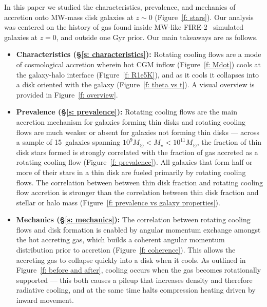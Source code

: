 \documentclass[fleqn,usenatbib]{mnras}
\newcommand{\Nsample}{15}
\begin{document}
In this paper we studied the characteristics, prevalence, and mechanics of accretion onto MW-mass disk galaxies at $z \sim 0$ (Figure~\ref{f: stars}).
Our analysis was centered on the history of gas found inside MW-like FIRE-2~\citep{Hopkins2018b} simulated galaxies at $z=0$, and outside one Gyr prior.
Our main takeaways are as follows.
\begin{itemize}
    \item \textbf{Characteristics (\S\ref{s: characteristics}):}
    Rotating cooling flows are a mode of cosmological accretion wherein hot CGM inflow (Figure~\ref{f: Mdot}) cools at the galaxy-halo interface (Figure~\ref{f: R1e5K}), and as it cools it collapses into a disk oriented with the galaxy (Figure~\ref{f: theta vs t}).
    A visual overview is provided in Figure~\ref{f: overview}.
    \item \textbf{Prevalence (\S\ref{s: prevalence}):}
    Rotating cooling flows are the main accretion mechanism for galaxies forming thin disks and rotating cooling flows are much weaker or absent for galaxies not forming thin disks --- 
    across a sample of \Nsample~galaxies spanning $10^9 M_\odot < M_\star < 10^{11} M_\odot$, the fraction of thin disk stars formed is strongly correlated with the fraction of gas accreted as a rotating cooling flow (Figure~\ref{f: prevalence}).
    All galaxies that form half or more of their stars in a thin disk are fueled primarily by rotating cooling flows.
    The correlation between between thin disk fraction and rotating cooling flow accretion is stronger than the correlation between thin disk fraction and stellar or halo mass (Figure~\ref{f: prevalence vs galaxy properties}).
    \item \textbf{Mechanics (\S\ref{s: mechanics}):}
    The correlation between rotating cooling flows and disk formation is enabled by angular momentum exchange amongst the hot accreting gas, which builds a coherent angular momentum distribution prior to accretion (Figure~\ref{f: coherence}).
    This allows the accreting gas to collapse quickly into a disk when it cools.
    As outlined in Figure~\ref{f: before and after}, cooling occurs when the gas becomes rotationally supported --- this both causes a pileup that increases density and therefore radiative cooling, and at the same time halts compression heating driven by inward movement.
\end{itemize}
\end{document}
